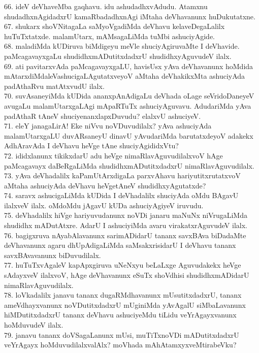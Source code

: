 \documentclass{article}
\begin{document}
66. ideV deVhaveMba gaqhavu. idu ashudadhxvAdudu. Atamxnu shudadhxnAgidadxrU kamaRbadadhxnAgi iMtaha deVhavanunx huDukutatxne.\\
67. shukarx shoVNitagaLa saMyoVgadiMda deVhavu kelaveDegaLalilx huTuTxtatxde. malamUtarx, mAMsagaLiMda tuMbi ashuciyAgide.\\
68. maladiMda kUDiruva biMdigeyu meVle shuciyAgiruvaMte I deVhavide. paMcagavayxgaLu shudidhxmADutitxdadxrU shudidhxyAguvudeV ilalx.\\
69. ati pavitarxvAda paMcagavayxgaLU, havisUsx yAva deVhavanunx hoMdida mAtarxdiMdaleVashucigaLAgutatxveyoV aMtaha deVhakikxMta ashuciyAda padAthaRvu matAtxvudU ilalx.\\
70. suvAsaneyiMda kUDida ananxpAnAdigaLu deVhada oLage seVridoDaneyeV avugaLu malamUtarxgaLAgi mApaRTuTx ashuciyAguvavu. AdudariMda yAva padAthaR tAneV shuciyenanxlapxDuvudu? elalxvU ashuciyeV.\\
71. eleY janagaLirA! Eke niVvu noVDuvudilalx? yAva ashuciyAda malamUtarxgaLU duvARsaneyU dinavU yAvudariMda barutatxdeyoV adakekx AdhAravAda I deVhavu heVge tAne shuciyAgididxVtu?\\
72. ididxlanunx tikikxdarU adu heVge nimaRlavAguvudilalxvoV hAge paMcagavayx daBeRgaLiMda shudidhxmADutitxdadxrU nimaRlavAguvudilalx.\\
73. yAva deVhadalilx kaPamUtArxdigaLa parxvAhavu hariyutitxrutatxvoV aMtaha ashuciyAda deVhavu heVgetAneV shudidhxyAgutatxde?\\
74. saravx ashucigaLiMda kUDida I deVhadalilx shuciyAda oMdu BAgavU ilalxveV ilalx. oMdoMdu jAgavU kUDa ashuciyAgiyeV iruvudu.\\
75. deVhadalilx hiVge hariyuvudanunx noVDi janaru maNuNx niVrugaLiMda shudidhx mADutAtxre. AdarU I ashuciyiMda avaru virakatxrAguvudeV ilalx.\\
76. bagigxruva nAyabAlavanunx sarimADidarU tananx savxBAva biDadaMte deVhavanunx agaru dhUpAdigaLiMda saMsakxrisidarU I deVhavu tananx savxBAvavanunx biDuvudilalx.\\
77. huTuTxvAgaleV kapApxgiruva uNeNxyu beLaLxge Aguvudakekx heVge sAdayxveV ilalxvoV, hAge deVhavanunx eSuTx shoVdhisi shudidhxmADidarU nimaRlavAguvudilalx.\\
78. loVkadalilx janavu tananx dugaRMdhavanunx mUsutitxdadxrU, tananx ameVdhayxvanunx noVDutitxdadxrU mUginiMda yAvAgalU siMbaLavanunx hiMDutitxdadxrU tananx deVhavu ashuciyeMdu tiLidu veYrAgayxvanunx hoMduvudeV ilalx.\\
79. janavu tananx doVSagaLanunx mUsi, muTiTxnoVDi mADutitxdadxrU veYrAgayx hoMduvudilalxvalAlx? moVhada mAhAtamxyxveMtirabeVku?\\
\end{document}

